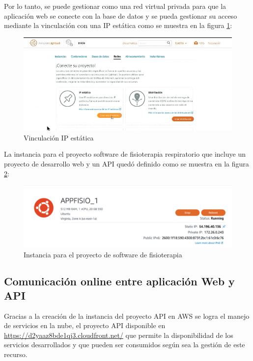 \documentclass[12pt]{article}
\begin{document}
Por lo tanto, se puede gestionar como una red virtual privada para que la aplicación web se conecte con la base de datos y se pueda gestionar su acceso mediante la vinculación con una IP estática como se muestra en la figura \ref{24}: 

\begin{figure}[ht]
\centering
\includegraphics[scale=0.4]{imag/IPestaticaAWS.png}
\caption{Vinculación IP estática }
\label{24}
\end{figure}
\FloatBarrier


La instancia para el proyecto software de fisioterapia respiratorio que incluye un proyecto de desarrollo web y un API quedó definido como se muestra en la figura \ref{25}:

\begin{figure}[ht]
\centering
\includegraphics[scale=0.4]{imag/instanciafisio.png}
\caption{Instancia para el proyecto de software de fisioterapia}
\label{25}
\end{figure}
\FloatBarrier







\subsection{Comunicación online entre aplicación Web y API}

Gracias a la creación de la instancia del proyecto API en AWS se logra el manejo de servicios en la nube, el proyecto API disponible en \url{https://d2yaaz8bde1qj3.cloudfront.net/} que permite la disponibilidad de los servicios desarrollados y que pueden ser consumidos según sea la gestión de este recurso. 
\end{document}
